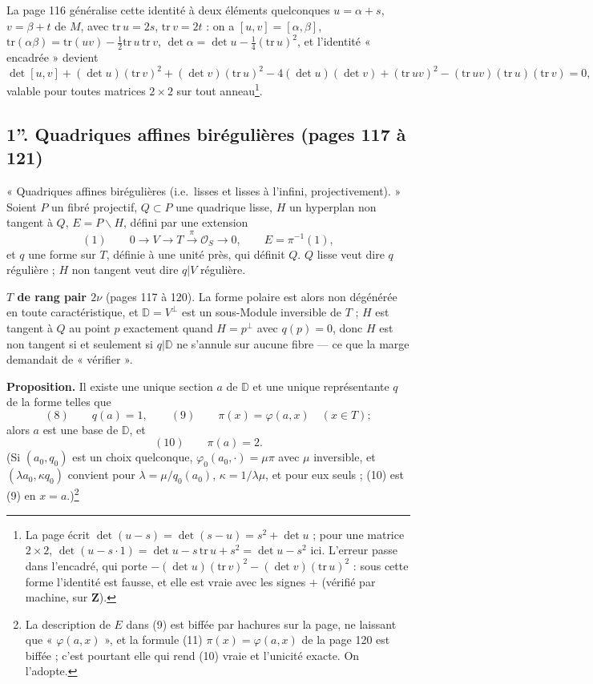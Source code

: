 \documentclass[11pt,a4paper]{article}
\begin{document}
La page 116 généralise cette identité à deux éléments quelconques $u = \alpha + s$,
$v = \beta + t$ de $M$, avec $\mathrm{tr}\,u = 2s$, $\mathrm{tr}\,v = 2t$ : on a $[u, v] =
[\alpha, \beta]$, $\mathrm{tr}(\alpha\beta) = \mathrm{tr}(uv) - \tfrac{1}{2}
\mathrm{tr}\,u\,\mathrm{tr}\,v$, $\det\alpha = \det u - \tfrac{1}{4}(\mathrm{tr}\,u)^2$, et
l'identité « encadrée » devient
\[
  \det[u, v] + (\det u)(\mathrm{tr}\,v)^2 + (\det v)(\mathrm{tr}\,u)^2 - 4(\det u)(\det
  v) + (\mathrm{tr}\,uv)^2 - (\mathrm{tr}\,uv)(\mathrm{tr}\,u)(\mathrm{tr}\,v) = 0,
\]
valable pour toutes matrices $2 \times 2$ sur tout anneau\footnote{La page écrit
$\det(u - s) = \det(s - u) = s^2 + \det u$ ; pour une matrice $2 \times 2$, $\det(u -
s\cdot 1) = \det u - s\,\mathrm{tr}\,u + s^2 = \det u - s^2$ ici. L'erreur passe dans
l'encadré, qui porte $-(\det u)(\mathrm{tr}\,v)^2 - (\det v)(\mathrm{tr}\,u)^2$ : sous
cette forme l'identité est fausse, et elle est vraie avec les signes $+$ (vérifié par
machine, sur $\mathbf{Z}$).}.

\subsection*{1''. Quadriques affines birégulières (pages 117 à 121)}

« Quadriques affines birégulières (i.e.\ lisses et lisses à l'infini,
projectivement). » Soient $P$ un fibré projectif, $Q \subset P$ une quadrique lisse,
$H$ un hyperplan non tangent à $Q$, $E = P \smallsetminus H$, défini par une extension
\[
  (1) \qquad 0 \to V \to T \xrightarrow{\ \pi\ } \mathcal{O}_S \to 0, \qquad E =
  \pi^{-1}(1),
\]
et $q$ une forme sur $T$, définie à une unité près, qui définit $Q$. $Q$ lisse veut
dire $q$ régulière ; $H$ non tangent veut dire $q|V$ régulière.

\textbf{$T$ de rang pair $2\nu$} (pages 117 à 120). La forme polaire est alors non
dégénérée en toute caractéristique, et $\mathbb{D} = V^{\perp}$ est un sous-Module
inversible de $T$ ; $H$ est tangent à $Q$ au point $p$ exactement quand $H = p^{\perp}$
avec $q(p) = 0$, donc $H$ est non tangent si et seulement si $q|\mathbb{D}$ ne s'annule
sur aucune fibre — ce que la marge demandait de « vérifier ».

\textbf{Proposition.} Il existe une unique section $a$ de $\mathbb{D}$ et une unique
représentante $q$ de la forme telles que
\[
  (8) \qquad q(a) = 1, \qquad (9) \qquad \pi(x) = \varphi(a, x) \quad (x \in T) ;
\]
alors $a$ est une base de $\mathbb{D}$, et
\[
  (10) \qquad \pi(a) = 2 .
\]
(Si $(a_0, q_0)$ est un choix quelconque, $\varphi_0(a_0, \cdot) = \mu\pi$ avec $\mu$
inversible, et $(\lambda a_0, \kappa q_0)$ convient pour $\lambda = \mu/q_0(a_0)$,
$\kappa = 1/\lambda\mu$, et pour eux seuls ; (10) est (9) en $x = a$.)\footnote{La
description de $E$ dans (9) est biffée par hachures sur la page, ne laissant que
« $\varphi(a, x)$ », et la formule (11) $\pi(x) = \varphi(a, x)$ de la page 120 est
biffée ; c'est pourtant elle qui rend (10) vraie et l'unicité exacte. On l'adopte.}
\end{document}
